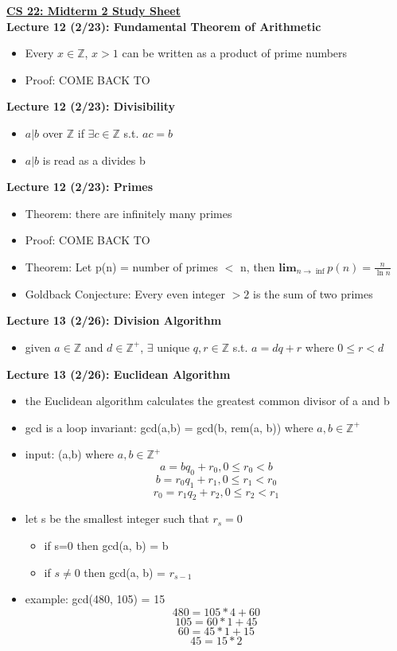 \documentclass[twocolumn]{article}
\begin{document}
\textbf{\underline{CS 22: Midterm 2 Study Sheet}} \\

\textbf{Lecture 12 (2/23): Fundamental Theorem of Arithmetic}
\begin{itemize}
    \item Every $x \in \mathbb{Z}$, $x>1$ can be written as a product of prime numbers
    \item Proof: COME BACK TO
\end{itemize}

\textbf{Lecture 12 (2/23): Divisibility}
\begin{itemize}
    \item $a|b$ over $\mathbb{Z}$ if $\exists c \in \mathbb{Z}$ s.t. $ac = b$ 
    \item $a|b$ is read as a divides b
\end{itemize}

\textbf{Lecture 12 (2/23): Primes}
\begin{itemize}
    \item Theorem: there are infinitely many primes
    \item Proof: COME BACK TO
    \item Theorem: Let p(n) = number of primes $<$ n, then $\textbf{lim}_{n\rightarrow \inf}p(n) = \frac{n}{\ln{n}}$
    \item Goldback Conjecture: Every even integer $>2$ is the sum of two primes
\end{itemize}

\textbf{Lecture 13 (2/26): Division Algorithm}
\begin{itemize}
    \item given $a \in \mathbb{Z}$ and $d \in \mathbb{Z}^+$, $\exists$ unique $q, r \in \mathbb{Z}$ s.t. $a=dq+r$ where $0 \leq r < d$
\end{itemize}

\textbf{Lecture 13 (2/26): Euclidean Algorithm}
\begin{itemize}
    \item the Euclidean algorithm calculates the greatest common divisor of a and b
    \item gcd is a loop invariant: gcd(a,b) = gcd(b, rem(a, b)) where $a, b \in \mathbb{Z}^+$
    \item input: (a,b) where $a, b \in \mathbb{Z}^+$
    $$a = bq_0 + r_0, 0 \leq r_0 < b$$
    $$b = r_0q_1+r_1, 0 \leq r_1 < r_0$$
    $$r_0 = r_1q_2 + r_2, 0 \leq r_2 < r_1$$
    \item let s be the smallest integer such that $r_s = 0$
    \begin{itemize}
        \item if s=0 then gcd(a, b) = b
        \item if $s \neq 0$ then gcd(a, b) = $r_{s-1}$
    \end{itemize}
    \item example: gcd(480, 105) = 15
    $$480 = 105*4+60$$
    $$105 = 60*1 + 45$$
    $$60 = 45*1 + 15$$
    $$45 = 15*2$$
\end{itemize}
\end{document}
